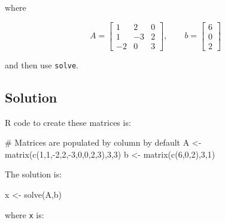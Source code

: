 \documentclass[
  letterpaper,
]{book}
\newenvironment{Shaded}{\begin{snugshade}}{\end{snugshade}}
\newcommand{\CommentTok}[1]{\textcolor[rgb]{0.37,0.37,0.37}{#1}}
\newcommand{\DecValTok}[1]{\textcolor[rgb]{0.68,0.00,0.00}{#1}}
\newcommand{\FunctionTok}[1]{\textcolor[rgb]{0.28,0.35,0.67}{#1}}
\newcommand{\NormalTok}[1]{\textcolor[rgb]{0.00,0.23,0.31}{#1}}
\newcommand{\OtherTok}[1]{\textcolor[rgb]{0.00,0.23,0.31}{#1}}
\newcommand{\SpecialCharTok}[1]{\textcolor[rgb]{0.37,0.37,0.37}{#1}}
\begin{document}
where

\begin{equation*}
A = \left [ \begin{array}{rrr}
             1 &  2 & 0 \\
             1 & -3 & 2 \\
            -2 &  0 & 3
            \end{array} \right ], \qquad 
  b = \left[ \begin{matrix}6 \\ 0 \\ 2\end{matrix} \right ]
\end{equation*}

and then use \texttt{solve}.

\hypertarget{solution}{%
\subsection{Solution}\label{solution}}

R code to create these matrices is:

\begin{Shaded}
\begin{Highlighting}[]
\CommentTok{\# Matrices are populated by column by default}
\NormalTok{A }\OtherTok{\textless{}{-}} \FunctionTok{matrix}\NormalTok{(}\FunctionTok{c}\NormalTok{(}\DecValTok{1}\NormalTok{,}\DecValTok{1}\NormalTok{,}\SpecialCharTok{{-}}\DecValTok{2}\NormalTok{,}\DecValTok{2}\NormalTok{,}\SpecialCharTok{{-}}\DecValTok{3}\NormalTok{,}\DecValTok{0}\NormalTok{,}\DecValTok{0}\NormalTok{,}\DecValTok{2}\NormalTok{,}\DecValTok{3}\NormalTok{),}\DecValTok{3}\NormalTok{,}\DecValTok{3}\NormalTok{)}
\NormalTok{b }\OtherTok{\textless{}{-}} \FunctionTok{matrix}\NormalTok{(}\FunctionTok{c}\NormalTok{(}\DecValTok{6}\NormalTok{,}\DecValTok{0}\NormalTok{,}\DecValTok{2}\NormalTok{),}\DecValTok{3}\NormalTok{,}\DecValTok{1}\NormalTok{)}
\end{Highlighting}
\end{Shaded}

The solution is:

\begin{Shaded}
\begin{Highlighting}[]
\NormalTok{x }\OtherTok{\textless{}{-}} \FunctionTok{solve}\NormalTok{(A,b)}
\end{Highlighting}
\end{Shaded}

where \texttt{x} is:
\end{document}
